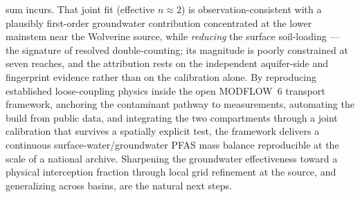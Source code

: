 sum incurs. That joint fit (effective $n\approx2$) is observation-consistent with a plausibly
first-order groundwater contribution concentrated at the lower mainstem near the Wolverine source,
while \emph{reducing} the surface soil-loading --- the signature of resolved double-counting; its
magnitude is poorly constrained at seven reaches, and the attribution rests on the independent
aquifer-side and fingerprint evidence rather than on the calibration alone. By reproducing established
loose-coupling physics inside the open MODFLOW~6 transport framework, anchoring the contaminant
pathway to measurements, automating the build from public data, and integrating the two compartments
through a joint calibration that survives a spatially explicit test, the framework delivers a
continuous surface-water/groundwater PFAS mass balance reproducible at the scale of a national
archive. Sharpening the groundwater effectiveness toward a physical interception fraction through
local grid refinement at the source, and generalizing across basins, are the natural next steps.
